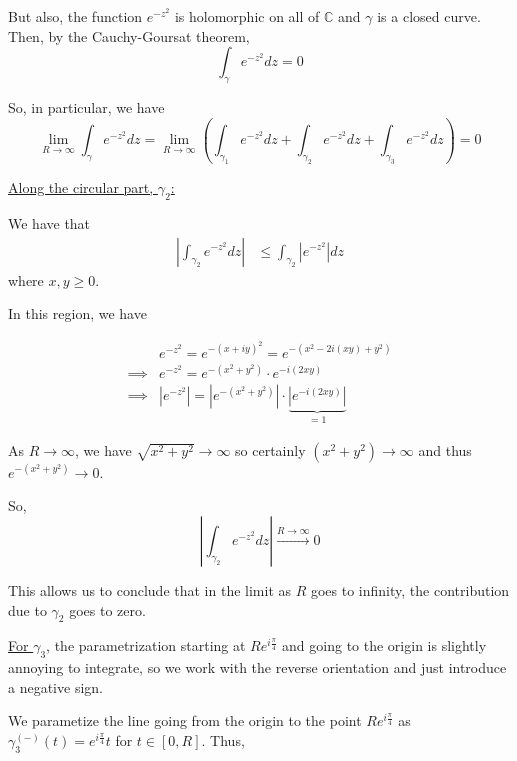 \documentclass{article}
\newcommand{\C}{\mathbb{C}}
\begin{document}
But also, the function $e^{-z^2}$ is holomorphic on all of $\C$ and $\gamma$ is a closed curve. Then, by the Cauchy-Goursat theorem, 
\[ \int_{\gamma} e^{-z^2} dz = 0 \]

So, in particular, we have 
\[ \lim_{R \rightarrow \infty} \int_{\gamma} e^{-z^2} dz = \lim_{R \rightarrow \infty}\left(\int_{{\gamma_1}} e^{-z^2} dz + \int_{{\gamma_2}} e^{-z^2} dz + \int_{{\gamma_3}} e^{-z^2} dz\right) = 0\]

\vskip 0.5cm
\underline{Along the circular part, $\gamma_2$:}

\vskip 0.25cm
We have that 
\begin{align}
  \left|\int_{{\gamma_2}} e^{-z^2} dz \right|&\leq \int_{{\gamma_2}} \left|e^{-z^2}\right| dz
\end{align}
where $x, y \geq 0$. 

\vskip 0.5cm
In this region, we have 

\begin{align}
  &e^{-z^2} = e^{-(x+iy)^2} = e^{-(x^2 - 2i(xy) + y^2)} \\
  \implies&e^{-z^2} =e^{-(x^2 + y^2)} \cdot e^{-i(2xy)} \\
  \implies& \left|e^{-z^2}\right| = \left|e^{-(x^2 + y^2)}\right| \cdot \underbrace{\left| e^{-i(2xy)} \right|}_{=1}
\end{align}

As $R \rightarrow \infty$, we have $\sqrt{x^2 + y^2} \rightarrow \infty$ so certainly $(x^2 + y^2) \rightarrow \infty$ and thus $e^{-(x^2 + y^2)} \rightarrow 0$.

\vskip 0.5cm
So,
\[  \left|\int_{{\gamma_2}} e^{-z^2} dz \right| \xrightarrow{R \rightarrow \infty} 0 \]

\vskip 0.25cm
This allows us to conclude that in the limit as $R$ goes to infinity, the contribution due to $\gamma_2$ goes to zero.


\vskip 0.5cm
\underline{For $\gamma_3$}, the parametrization starting at $Re^{i \frac{\pi}{4}}$ and going to the origin is slightly annoying to integrate, so we work with the reverse orientation and just introduce a negative sign.

\vskip 0.25cm
We parametize the line going from the origin to the point $Re^{i \frac{\pi}{4}}$ as $\gamma_3^{(-)}(t) = e^{i \frac{\pi}{4}} t$ for $t \in [0, R]$. Thus,
\end{document}
